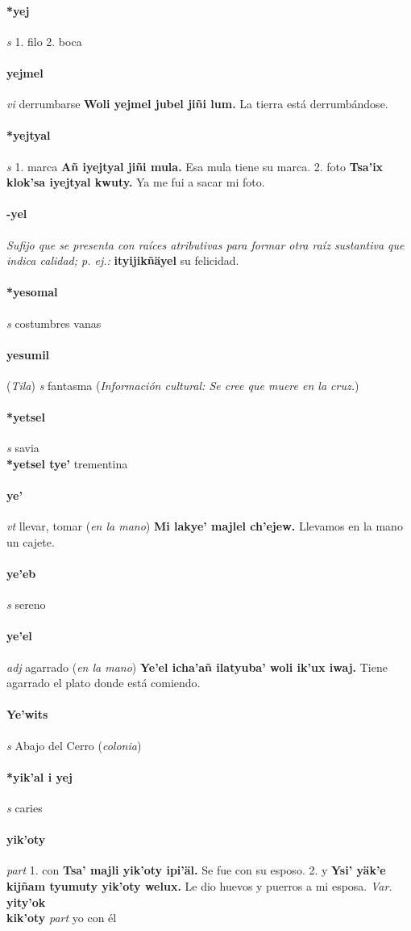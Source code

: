 \documentclass{scrbook}
\newcommand{\entry}[1]{\paragraph{#1}}
\newcommand{\onedefinition}[1]{#1.}
\newcommand{\nontranslationdef}[1]{\textit{#1}}
\newcommand{\partofspeech}[1]{\textit{#1}}
\newcommand{\spanishtranslation}[1]{#1}
\newcommand{\clarification}[1]{(\textit{#1})}
\newcommand{\cholexample}[1]{\textbf{#1}}
\newcommand{\exampletranslation}[1]{#1}
\newcommand{\relevantdialect}[1]{(\textit{#1})}
\newcommand{\culturalinformation}[1]{(\textit{#1})}
\newcommand{\secondaryentry}[1]{\\\textbf{#1}}
\newcommand{\secondpartofspeech}[1]{\textit{#1}}
\newcommand{\secondtranslation}[1]{#1}
\newcommand{\variation}[1]{\textit{Var.} \textbf{#1}}
\begin{document}
\begin{multicols}{2}
\entry{*yej}
\partofspeech{s}
\onedefinition{1}
\spanishtranslation{filo}
\onedefinition{2}
\spanishtranslation{boca}

\entry{yejmel}
\partofspeech{vi}
\spanishtranslation{derrumbarse}
\cholexample{Woli yejmel jubel jiñi lum.}
\exampletranslation{La tierra está derrumbándose.}

\entry{*yejtyal}
\partofspeech{s}
\onedefinition{1}
\spanishtranslation{marca}
\cholexample{Añ iyejtyal jiñi mula.}
\exampletranslation{Esa mula tiene su marca.}
\onedefinition{2}
\spanishtranslation{foto}
\cholexample{Tsa'ix klok'sa iyejtyal kwuty.}
\exampletranslation{Ya me fui a sacar mi foto.}

\entry{-yel}
\nontranslationdef{Sufijo que se presenta con raíces atributivas para formar otra raíz sustantiva que indica calidad; p. ej.:}
\cholexample{ityijikñäyel}
\exampletranslation{su felicidad.}

\entry{*yesomal}
\partofspeech{s}
\spanishtranslation{costumbres vanas}

\entry{yesumil}
\relevantdialect{Tila}
\partofspeech{s}
\spanishtranslation{fantasma}
\culturalinformation{Información cultural: Se cree que muere en la cruz.}

\entry{*yetsel}
\partofspeech{s}
\spanishtranslation{savia}
\secondaryentry{*yetsel tye'}
\secondtranslation{trementina}

\entry{ye'}
\partofspeech{vt}
\spanishtranslation{llevar, tomar}
\clarification{en la mano}
\cholexample{Mi lakye' majlel ch'ejew.}
\exampletranslation{Llevamos en la mano un cajete.}

\entry{ye'eb}
\partofspeech{s}
\spanishtranslation{sereno}

\entry{ye'el}
\partofspeech{adj}
\spanishtranslation{agarrado}
\clarification{en la mano}
\cholexample{Ye'el icha'añ ilatyuba' woli ik'ux iwaj.}
\exampletranslation{Tiene agarrado el plato donde está comiendo.}

\entry{Ye'wits}
\partofspeech{s}
\spanishtranslation{Abajo del Cerro}
\clarification{colonia}

\entry{*yik'al i yej}
\partofspeech{s}
\spanishtranslation{caries}

\entry{yik'oty}
\partofspeech{part}
\onedefinition{1}
\spanishtranslation{con}
\cholexample{Tsa' majli yik'oty ipi'äl.}
\exampletranslation{Se fue con su esposo.}
\onedefinition{2}
\spanishtranslation{y}
\cholexample{Ysi' yäk'e kijñam tyumuty yik'oty welux.}
\exampletranslation{Le dio huevos y puerros a mi esposa.}
\variation{yity'ok}
\secondaryentry{kik'oty}
\secondpartofspeech{part}
\secondtranslation{yo con él}


\end{multicols}
\end{document}
